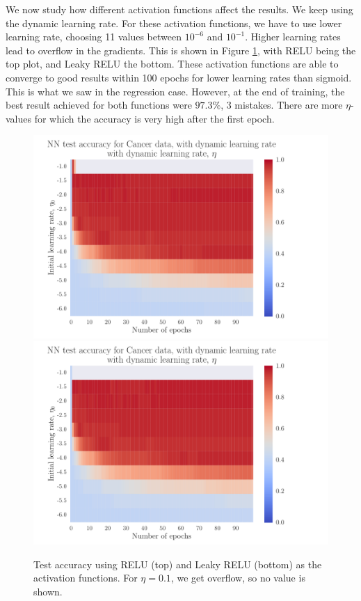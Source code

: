 \documentclass[12pt]{extarticle}
\begin{document}
We now study how different activation functions affect the results. We keep using the dynamic learning rate. For these activation functions, we have to use lower learning rate, choosing 11 values between $10^{-6}$ and $10^{-1}$. Higher learning rates lead to overflow in the gradients. This is shown in Figure \ref{fig:NN_Cancer_relu_leaky}, with RELU being the top plot, and Leaky RELU the bottom. These activation functions are able to converge to good results within 100 epochs for lower learning rates than sigmoid. This is what we saw in the regression case. However, at the end of training, the best result achieved for both functions were $97.3\%$, 3 mistakes. There are more $\eta$-values for which the accuracy is very high after the first epoch.


\begin{figure}[h]
	\includegraphics[width=\linewidth]{plots/NN_Cancer__epochs_dynamic_eta__test_accuracy__relu__539592.pdf}
	\includegraphics[width=\linewidth]{plots/NN_Cancer__epochs_dynamic_eta__test_accuracy__leaky_relu__144576.pdf}
	\caption{Test accuracy using RELU (top) and Leaky RELU (bottom) as the activation functions. For $\eta=0.1$, we get overflow, so no value is shown. }\label{fig:NN_Cancer_relu_leaky}
\end{figure}
\end{document}
